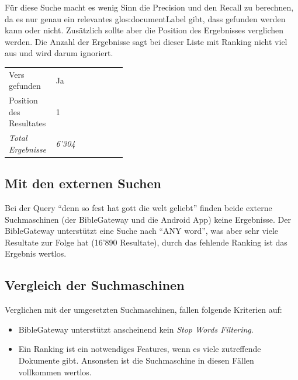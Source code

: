 Für diese Suche macht es wenig Sinn die Precision und den Recall zu berechnen, da es nur genau ein relevantes \gls{glos:documentLabel} gibt, dass gefunden werden kann oder nicht.
Zusätzlich sollte aber die Position des Ergebnisses verglichen werden.
Die Anzahl der Ergebnisse sagt bei dieser Liste mit Ranking nicht viel aus und wird darum ignoriert.

\begin{table}[H]
	\centering
	\small\renewcommand{\arraystretch}{1.4}
	\begin{tabularx}{0.6\textwidth}{ L{0.4\linewidth} | X }%
		\hline
		Vers gefunden & Ja\\
		Position des Resultates & 1\\
		\textit{Total Ergebnisse} & \textit{6'304}\\
		\hline
	\end{tabularx}
\end{table}


\subsection{Mit den externen Suchen}
Bei der Query "`denn so fest hat gott die welt geliebt"' finden beide externe Suchmaschinen (der BibleGateway und die Android App) keine Ergebnisse.
Der BibleGateway unterstützt eine Suche nach "`ANY word"', was aber sehr viele Resultate zur Folge hat (16'890 Resultate), durch das fehlende Ranking ist das Ergebnis wertlos.

\subsection{Vergleich der Suchmaschinen}
Verglichen mit der umgesetzten Suchmaschinen, fallen folgende Kriterien auf:
\begin{itemize}[noitemsep]
	\item BibleGateway unterstützt anscheinend kein \textit{Stop Words Filtering}.
	\item Ein Ranking ist ein notwendiges Features, wenn es viele zutreffende Dokumente gibt. Ansonsten ist die Suchmaschine in diesen Fällen vollkommen wertlos.
\end{itemize}


